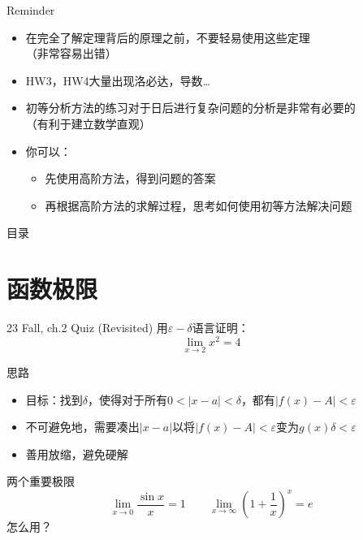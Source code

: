 \documentclass[]{beamer}
\begin{document}
\begin{frame}{Reminder}
    \begin{itemize}
        \item 在完全了解定理背后的原理之前，不要轻易使用这些定理\\（非常容易出错）
        \item HW3，HW4大量出现洛必达，导数\dots
        \item 初等分析方法的练习对于日后进行复杂问题的分析是非常有必要的\\ （有利于建立数学直观）
        \item 你可以：
        \begin{itemize}
            \item 先使用高阶方法，得到问题的答案
            \item 再根据高阶方法的求解过程，思考如何使用初等方法解决问题
        \end{itemize}
    \end{itemize}
\end{frame}

\begin{frame}{目录}
    \tableofcontents
\end{frame}


\section{函数极限}

\begin{frame}{23 Fall, ch.2 Quiz (Revisited)}
    用$\varepsilon-\delta$语言证明：
    \[
    \lim_{x\rightarrow2}x^2=4
    \]
\end{frame}

\begin{frame}{思路}
    \begin{itemize}
        \item 目标：找到$\delta$，使得对于所有$0<|x-a|<\delta$，都有$|f(x)-A|<\varepsilon$
        \item 不可避免地，需要凑出$|x-a|$以将$|f(x)-A|<\varepsilon$变为$g(x)\delta<\varepsilon$
        \item 善用放缩，避免硬解
    \end{itemize}
\end{frame}

\begin{frame}{两个重要极限}
    \[
    \lim_{x\rightarrow0}\frac{\sin x}{x}=1\qquad\lim_{x\rightarrow\infty}(1+\frac1x)^x=e
    \]
    怎么用？
\end{frame}
\end{document}
